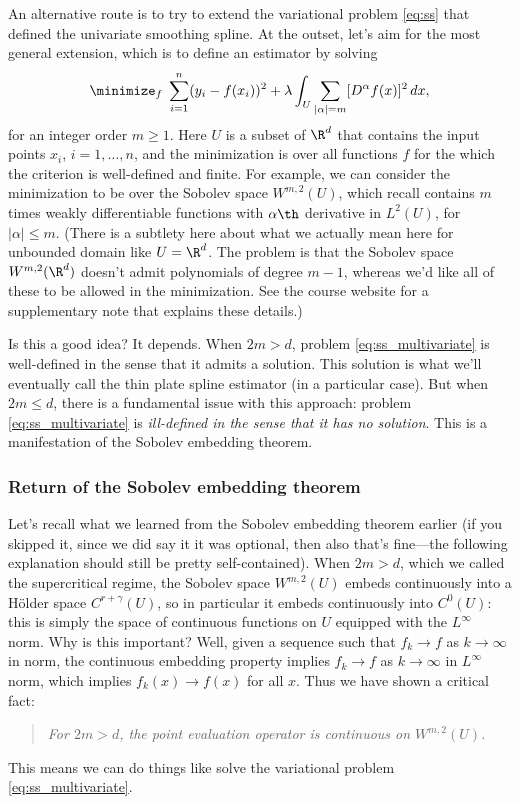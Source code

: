 \documentclass{article}
\begin{document}
An alternative route is to try to extend the variational problem \eqref{eq:ss}
that defined the univariate smoothing spline. At the outset, let's aim for the
most general extension, which is to define an estimator by solving
\begin{equation}
\label{eq:ss_multivariate}
\minimize_f \; \sum_{i=1}^n (y_i - f(x_i))^2 + \lambda \int_U \sum_{|\alpha| =
  m} [D^\alpha f(x)]^2 \, dx,   
\end{equation}
for an integer order $m \geq 1$. Here $U$ is a subset of $\R^d$ that contains
the input points $x_i$, $i=1,\dots,n$, and the minimization is over all
functions $f$ for the which the criterion is well-defined and finite. For
example, we can consider the minimization to be over the Sobolev space
$W^{m,2}(U)$, which recall contains $m$ times weakly differentiable functions
with $\alpha\th$ derivative in $L^2(U)$, for $|\alpha| \leq m$. (There is a
subtlety here about what we actually mean here for unbounded domain like $U =
\R^d$. The problem is that the Sobolev space  $W^{m,2}(\R^d)$ doesn't admit
polynomials of degree $m-1$, whereas we'd like all of these to be allowed in the
minimization. See the course website for a supplementary note that explains
these details.) 

Is this a good idea? It depends. When $2m > d$, problem
\eqref{eq:ss_multivariate} is well-defined in the sense that it admits a
solution. This solution is what we'll eventually call the thin plate spline
estimator (in a particular case). But when $2m \leq d$, there is a fundamental
issue with this approach: problem \eqref{eq:ss_multivariate} is
\emph{ill-defined in the sense that it has no solution}. This is a manifestation
of the Sobolev embedding theorem.

\subsubsection{Return of the Sobolev embedding theorem}

Let's recall what we learned from the Sobolev embedding theorem earlier (if you
skipped it, since we did say it it was optional, then also that's fine---the
following explanation should still be pretty self-contained). When $2m > d$,
which we called the supercritical regime, the Sobolev space $W^{m,2}(U)$ embeds
continuously into a H{\"o}lder space $C^{r+\gamma}(U)$, so in particular it
embeds continuously into $C^0(U)$: this is simply the space of continuous
functions on $U$ equipped with the $L^\infty$ norm. %
Why is this important? Well, given a sequence such that $f_k \to f$ as $k \to
\infty$ in  norm, the continuous embedding
property implies $f_k \to f$ as $k \to \infty$ in $L^\infty$ norm, which implies
$f_k(x) \to f(x)$ for all $x$. Thus we have shown a critical fact:
\begin{quote}
\centering\it
For $2m > d$, the point evaluation operator is continuous on $W^{m,2}(U)$.   
\end{quote}
This means we can do things like solve the variational problem
\eqref{eq:ss_multivariate}. 
\end{document}
